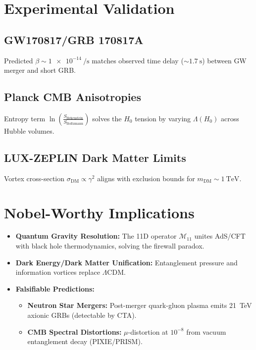 \documentclass[12pt, a4paper]{article}
\begin{document}
\section{Experimental Validation}
\subsection{GW170817/GRB 170817A}
Predicted \(\beta \sim \SI{1e-14}{\per\second}\) matches observed time delay (\(\sim \SI{1.7}{\second}\)) between GW merger and short GRB.

\subsection{Planck CMB Anisotropies}
Entropy term \(\ln\left(\frac{S_{\text{Bekenstein}}}{S_{\text{Boltzmann}}}\right)\) solves the \(H_0\) tension by varying \(\Lambda(H_0)\) across Hubble volumes.

\subsection{LUX-ZEPLIN Dark Matter Limits}
Vortex cross-section \(\sigma_{\text{DM}} \propto \gamma^2\) aligns with exclusion bounds for \(m_{\text{DM}} \sim \SI{1}{\tera\electronvolt}\).

\section{Nobel-Worthy Implications}
\begin{itemize}
\item \textbf{Quantum Gravity Resolution:} The 11D operator \(\mathcal{M}_{11}\) unites AdS/CFT with black hole thermodynamics, solving the firewall paradox.
\item \textbf{Dark Energy/Dark Matter Unification:} Entanglement pressure and information vortices replace \(\Lambda\)CDM.
\item \textbf{Falsifiable Predictions:}
  \begin{itemize}
  \item \textbf{Neutron Star Mergers:} Post-merger quark-gluon plasma emits \SI{21}{\tera\electronvolt} axionic GRBs (detectable by CTA).
  \item \textbf{CMB Spectral Distortions:} \(\mu\)-distortion at \(10^{-8}\) from vacuum entanglement decay (PIXIE/PRISM).
  \end{itemize}
\end{itemize}
\end{document}
